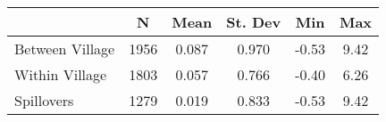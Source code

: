 \begin{tabular}{l*{5}{c}}\hline&\multicolumn{1}{c}{N}&\multicolumn{1}{c}{Mean}&\multicolumn{1}{c}{St. Dev}&\multicolumn{1}{c}{Min}&\multicolumn{1}{c}{Max}\\ \hline 
Between Village & 1956 & 0.087 & 0.970 & -0.53 & 9.42 \\
Within Village & 1803 & 0.057 & 0.766 & -0.40 & 6.26 \\
Spillovers & 1279 & 0.019 & 0.833 & -0.53 & 9.42 \\
\hline \end{tabular}

